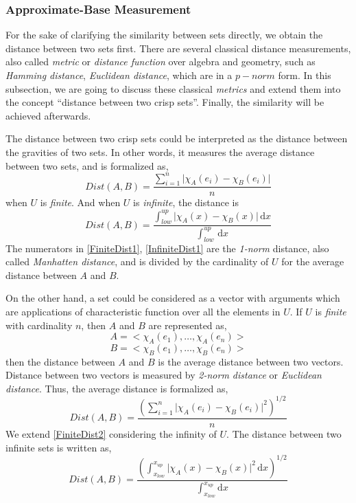 \subsubsection{Approximate-Base Measurement}
\label{sec:Approximate Base}
For the sake of clarifying the similarity between sets directly, we obtain the distance between two sets first. There are several classical distance measurements, also called \textit{metric} or \textit{distance function}  over algebra and geometry, such as \textit{Hamming distance}, \textit{Euclidean distance}, which are in a $p-norm$ form.
In this subsection, we are going to discuss these classical \textit{metrics} and extend them into the concept ``distance between two crisp sets''. Finally, the similarity will be achieved afterwards.

The distance between two crisp sets could be interpreted as the distance between the gravities of two sets. In other words, it measures the average distance between two sets, and is formalized as,
\begin{equation}\label{FiniteDist1}
Dist(A,B)=\frac{\sum_{i=1}^{n} \lvert \chi_{A}(e_i) - \chi_{B}(e_i) \rvert}{n}
\end{equation}
when $U$ is \textit{finite}. And when $U$ is \textit{infinite}, the distance is
\begin{equation}\label{InfiniteDist1}
Dist(A,B)=\frac{\int_{low}^{up} \lvert \chi_{A}(x) - \chi_{B}(x) \rvert\, \mathrm{d}x}{\int_{low}^{up}\, \mathrm{d}x}
\end{equation}
The numerators in \eqref{FiniteDist1}, \eqref{InfiniteDist1} are the \textit{1-norm} distance, also called \textit{Manhatten distance}, and is divided by the cardinality of $U$ for the average distance between $A$ and $B$.

On the other hand, a set could be considered as a vector with arguments which are applications of characteristic function over all the elements in $U$.
If $U$ is \textit{finite} with cardinality $n$, then $A$ and $B$ are represented as,
\[A = < \chi_{A}(e_1), \dots, \chi_{A}(e_n)>\]
\[B = < \chi_{B}(e_1), \dots, \chi_{B}(e_n)>\]
then the distance between $A$ and $B$ is the average distance between two vectors. Distance between two vectors is measured by \textit{2-norm distance} or \textit{Euclidean distance}. Thus, the average distance is formalized as,
\begin{equation}\label{FiniteDist2}
Dist(A,B) = \frac{(\sum_{i=1}^{n} \lvert \chi_{A}(e_i) - \chi_{B}(e_i) \rvert ^2)^{1/2}}{n}
\end{equation}
We extend \eqref{FiniteDist2} considering the infinity of $U$. The distance between two infinite sets is written as,
\begin{equation}\label{InfiniteDist2}
Dist(A,B) = \frac{(\int_{x_{low}}^{x_{up}}\lvert \chi_{A}(x) - \chi_{B}(x) \rvert^2\, \mathrm{d}x)^{1/2}}{\int_{x_{low}}^{x_{up}}\mathrm{d}x}
\end{equation}

